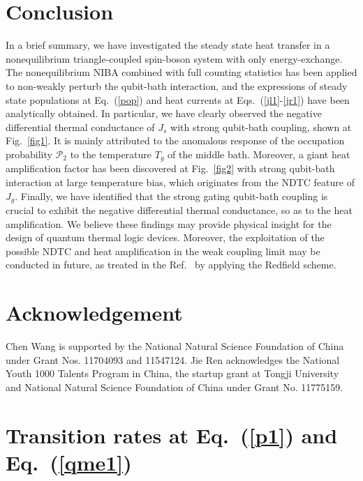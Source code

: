 \documentclass[twocolumn,preprintnumbers,amsmath,amssymb]{revtex4}
\begin{document}
\section{Conclusion}
In a brief summary, we have investigated the steady state heat transfer in a nonequilibrium triangle-coupled spin-boson system with only energy-exchange.
The nonequilibrium NIBA combined with full counting statistics has been applied to non-weakly perturb the qubit-bath interaction,
and the expressions of steady state populations at Eq.~(\ref{pop}) and heat currents at Eqs.~(\ref{jl1}-\ref{jr1}) have been analytically obtained.
In particular, we have clearly observed the negative differential thermal conductance of $J_s$ with strong qubit-bath coupling,
shown at Fig.~\ref{fig1}.
It is mainly attributed to the anomalous response of the occupation probability $\mathcal{P}_2$ to the temperature $T_g$ of the middle bath.
Moreover, a giant heat amplification factor has been discovered at Fig.~\ref{fig2} with strong qubit-bath interaction at large temperature bias,
which originates from the NDTC feature of $J_g$.
Finally, we have identified that the strong gating qubit-bath coupling is crucial to exhibit the negative differential thermal conductance, so as to the heat amplification.
We believe these findings may provide physical insight for the design of  quantum thermal logic devices.
Moreover, the exploitation of the possible NDTC and heat amplification in the weak coupling limit may be conducted in future, as treated in the Ref.~\cite{kjoulain2016prl} by applying the Redfield scheme.


\section{Acknowledgement}

Chen Wang is supported by the National Natural Science Foundation of China under Grant Nos. 11704093 and 11547124.
Jie Ren acknowledges the National Youth 1000 Talents Program in China, the startup grant at Tongji University and National Natural Science Foundation of China under Grant No. 11775159.





\appendix
\section{Transition rates at Eq.~(\ref{p1}) and Eq.~(\ref{qme1})}
\end{document}
